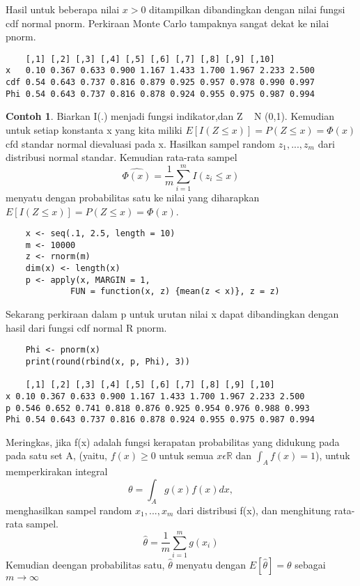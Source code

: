 \documentclass[a4paper,12pt]{article}
\theoremstyle{definition}
\newtheorem{example}{Contoh}[section]
\begin{document}
Hasil untuk beberapa nilai $x>0$ ditampilkan dibandingkan dengan nilai fungsi cdf normal pnorm. Perkiraan Monte Carlo tampaknya sangat dekat ke nilai pnorm. 

\begin{lstlisting}
    [,1] [,2] [,3] [,4] [,5] [,6] [,7] [,8] [,9] [,10]
x   0.10 0.367 0.633 0.900 1.167 1.433 1.700 1.967 2.233 2.500
cdf 0.54 0.643 0.737 0.816 0.879 0.925 0.957 0.978 0.990 0.997
Phi 0.54 0.643 0.737 0.816 0.878 0.924 0.955 0.975 0.987 0.994
\end{lstlisting}

\begin{example}
    Biarkan I(.) menjadi fungsi indikator,dan Z ~ N (0,1). Kemudian untuk setiap konstanta x yang kita miliki $E[I(Z\leq x)]= P(Z\leq x)= \Phi (x)$ cfd standar normal dievaluasi pada x.
    Hasilkan sampel random $z_{1},...,z_{m}$ dari distribusi normal standar. Kemudian rata-rata sampel
    \begin{equation}
        \widehat{\Phi (x)}= \frac{1}{m}\sum_{i=1}^{m}I(z_{i}\leq x)
    \end{equation}
    menyatu dengan probabilitas satu ke nilai yang diharapkan $E[I(Z\leq x)]= P(Z\leq x)= \Phi (x)$.
\end{example}
\begin{lstlisting}
    x <- seq(.1, 2.5, length = 10)
    m <- 10000
    z <- rnorm(m)
    dim(x) <- length(x)
    p <- apply(x, MARGIN = 1,
             FUN = function(x, z) {mean(z < x)}, z = z)
\end{lstlisting}

Sekarang perkiraan dalam p untuk urutan nilai x dapat dibandingkan dengan hasil dari fungsi cdf normal R pnorm.

\begin{lstlisting}
    Phi <- pnorm(x)
    print(round(rbind(x, p, Phi), 3))

    [,1] [,2] [,3] [,4] [,5] [,6] [,7] [,8] [,9] [,10]
x 0.10 0.367 0.633 0.900 1.167 1.433 1.700 1.967 2.233 2.500
p 0.546 0.652 0.741 0.818 0.876 0.925 0.954 0.976 0.988 0.993
Phi 0.54 0.643 0.737 0.816 0.878 0.924 0.955 0.975 0.987 0.994
\end{lstlisting}

Meringkas, jika f(x) adalah fungsi kerapatan probabilitas yang didukung pada pada satu set A, (yaitu, $f(x)\geq 0$ untuk semua $x\epsilon\mathbb{R}$ dan $\int _{A}f(x)= 1$), untuk memperkirakan integral
\begin{equation}
    \theta = \int _{A}g(x)f(x)dx,
\end{equation}
menghasilkan sampel random $x_{1},...,x_{m}$ dari distribusi f(x), dan menghitung rata-rata sampel.
\begin{equation}
    \widehat{\theta }= \frac{1}{m}\sum_{i=1}^{m}g(x_{i})
\end{equation}
Kemudian deengan probabilitas satu, $\widehat{\theta }$ menyatu dengan $E[\widehat{\theta }]= \theta $ sebagai $m\rightarrow \infty $
\end{document}
